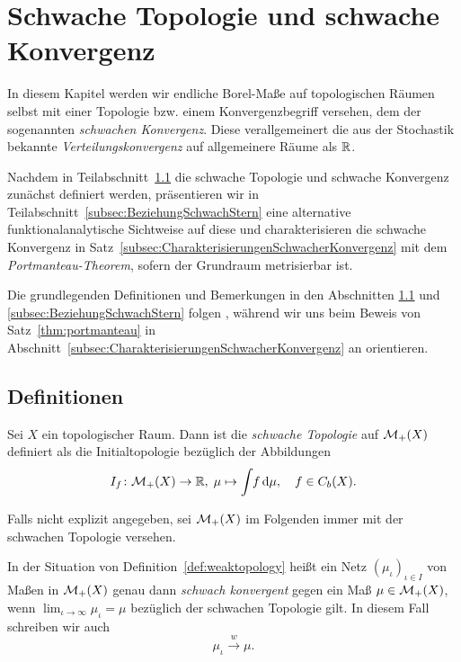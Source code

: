 \documentclass[../main/main.tex]{subfiles}
\begin{document}
	
	\section{Schwache Topologie und schwache Konvergenz}
	
	In diesem Kapitel werden wir endliche Borel-Maße auf topologischen Räumen selbst
	mit einer Topologie bzw. einem Konvergenzbegriff versehen, dem der sogenannten \emph{schwachen Konvergenz}. Diese
	verallgemeinert die aus der Stochastik bekannte \emph{Verteilungskonvergenz} auf allgemeinere Räume als $\mathbb{R}$. 
	
	Nachdem in Teilabschnitt~\ref{subsec:Definition} die schwache Topologie und schwache Konvergenz zunächst definiert werden, präsentieren wir in Teilabschnitt~\ref{subsec:BeziehungSchwachStern}
	eine alternative funktionalanalytische Sichtweise auf diese und charakterisieren die schwache Konvergenz in Satz~\ref{subsec:CharakterisierungenSchwacherKonvergenz} mit dem \emph{Portmanteau-Theorem},
	sofern der Grundraum metrisierbar ist.
	
	Die grundlegenden Definitionen und Bemerkungen in den Abschnitten \ref{subsec:Definition} und \ref{subsec:BeziehungSchwachStern} folgen 
	\cite[Abschnitte 1-3]{Varadarajan.1958}, während wir uns beim Beweis von Satz~\ref{thm:portmanteau} in Abschnitt~\ref{subsec:CharakterisierungenSchwacherKonvergenz}
	an \cite[Satz 4.14.4]{Simon.2015} orientieren.

	\subsection{Definitionen}
	\label{subsec:Definition}
	
	\begin{Definition}
		\label{def:weaktopology}
		Sei $X$ ein topologischer Raum. Dann ist die \emph{schwache Topologie} auf $\mathcal{M}_{+}(X)$ definiert als die 
		Initialtopologie bezüglich der Abbildungen
		\[ I_f \colon \mathcal{M}_{+}(X) \to \mathbb{R}, \; \mu \mapsto \int_{} \, f \, \mathrm{d}\mu , \quad f \in C_b(X) \text{.} \]
	\end{Definition}

	Falls nicht explizit angegeben, sei $\mathcal{M}_{+}(X)$ im Folgenden immer mit der schwachen Topologie versehen.

	\begin{Definition}
		In der Situation von Definition~\ref{def:weaktopology} heißt ein Netz $(\mu_\iota)_{\iota \in I}$ von Maßen in $\mathcal{M}_{+}(X)$ genau dann 
		\emph{schwach konvergent} gegen ein Maß $\mu \in \mathcal{M}_{+}(X)$, wenn $\lim_{\iota \to \infty} \mu_\iota = \mu$ bezüglich der schwachen Topologie gilt.
		In diesem Fall schreiben wir auch
		\[ \mu_\iota \xrightarrow{w} \mu \text{.} \]
	\end{Definition}
\end{document}
